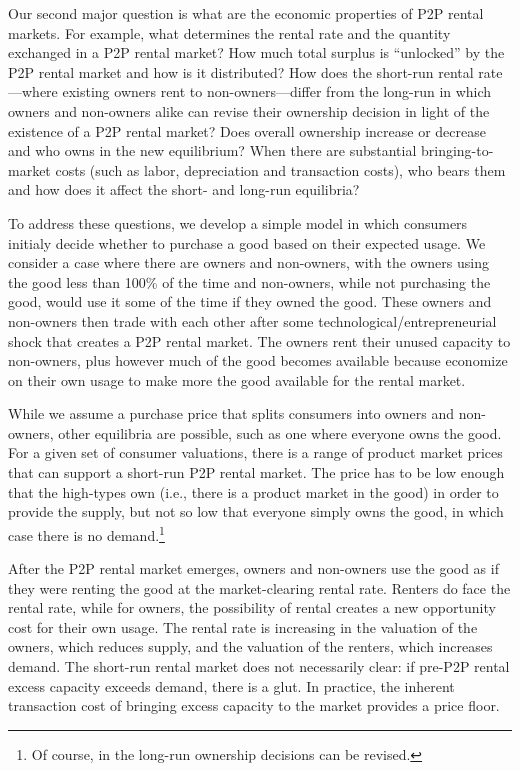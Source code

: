 \documentclass[11pt]{article}
\begin{document}
Our second major question is what are the economic properties of P2P rental markets. 
For example, what determines the rental rate and the quantity exchanged in a P2P rental market? 
How much total surplus is ``unlocked'' by the P2P rental market and how is it distributed? 
How does the short-run rental rate---where existing owners rent to non-owners---differ from the long-run in which owners and non-owners alike can revise their ownership decision in light of the existence of a P2P rental market?
Does overall ownership increase or decrease and who owns in the new equilibrium?
When there are substantial bringing-to-market costs (such as labor, depreciation and transaction costs), who bears them and how does it affect the short- and long-run equilibria? 

To address these questions, we develop a simple model in which consumers initialy decide whether to purchase a good based on their expected usage.
We consider a case where there are owners and non-owners, with the owners using the good less than 100\% of the time and non-owners, while not purchasing the good, would use it some of the time if they owned the good. 
These owners and non-owners then trade with each other after some technological/entrepreneurial shock that creates a P2P rental market.
The owners rent their unused capacity to non-owners, plus however much of the good becomes available because economize on their own usage to make more the good available for the rental market.

While we assume a purchase price that splits consumers into owners and non-owners, other equilibria are possible, such as one where everyone owns the good.
For a given set of consumer valuations, there is a range of product market prices that can support a short-run P2P rental market.
The price has to be low enough that the high-types own (i.e., there is a product market in the good) in order to provide the supply, but not so low that everyone simply owns the good, in which case there is no demand.\footnote{
  Of course, in the long-run ownership decisions can be revised.
}   

After the P2P rental market emerges, owners and non-owners use the good as if they were renting the good at the market-clearing rental rate. 
Renters do face the rental rate, while for owners, the possibility of rental creates a new opportunity cost for their own usage. 
The rental rate is increasing in the valuation of the owners, which reduces supply, and the valuation of the renters, which increases demand. 
The short-run rental market does not necessarily clear: if pre-P2P rental excess capacity exceeds demand, there is a glut. 
In practice, the inherent transaction cost of bringing excess capacity to the market provides a price floor.     
\end{document}
